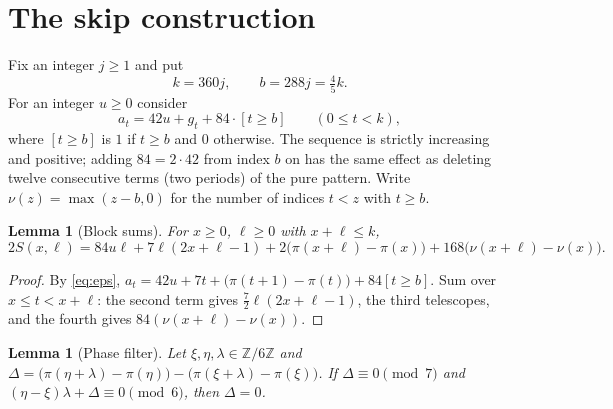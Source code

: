 \documentclass[11pt]{amsart}
\newtheorem{lemma}[theorem]{Lemma}
\theoremstyle{remark}
\newcommand{\Z}{\mathbb{Z}}
\begin{document}
\section{The skip construction}\label{sec:skip}

Fix an integer $j\ge1$ and put
\[
  k=360j,\qquad b=288j=\tfrac45k .
\]
For an integer $u\ge0$ consider
\begin{equation}\label{eq:skip}
  a_t=42u+g_t+84\cdot[t\ge b]\qquad(0\le t<k),
\end{equation}
where $[t\ge b]$ is $1$ if $t\ge b$ and $0$ otherwise. The sequence is strictly increasing and positive; adding $84=2\cdot42$ from index $b$
on has the same effect as deleting twelve consecutive terms (two periods) of the pure pattern. Write $\nu(z)=\max(z-b,0)$ for the number
of indices $t<z$ with $t\ge b$.

\begin{lemma}[Block sums]\label{lem:window}
For $x\ge0$, $\ell\ge0$ with $x+\ell\le k$,
\[
  2S(x,\ell)=84u\ell+7\ell(2x+\ell-1)+2\bigl(\pi(x+\ell)-\pi(x)\bigr)+168\bigl(\nu(x+\ell)-\nu(x)\bigr).
\]
\end{lemma}

\begin{proof}
By \eqref{eq:eps}, $a_t=42u+7t+\bigl(\pi(t+1)-\pi(t)\bigr)+84[t\ge b]$. Sum over $x\le t<x+\ell$: the second term gives
$\frac72\ell(2x+\ell-1)$, the third telescopes, and the fourth gives $84(\nu(x+\ell)-\nu(x))$.
\end{proof}

\begin{lemma}[Phase filter]\label{lem:phase}
Let $\xi,\eta,\lambda\in\Z/6\Z$ and
$\Delta=\bigl(\pi(\eta+\lambda)-\pi(\eta)\bigr)-\bigl(\pi(\xi+\lambda)-\pi(\xi)\bigr)$. If $\Delta\equiv0\pmod7$ and
$(\eta-\xi)\lambda+\Delta\equiv0\pmod6$, then $\Delta=0$.
\end{lemma}
\end{document}
